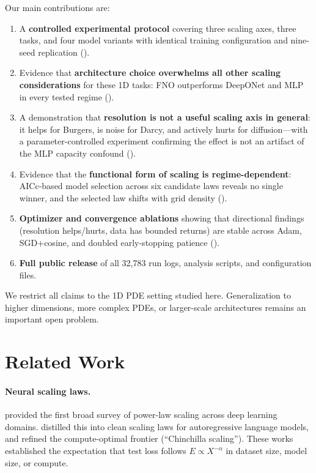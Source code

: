 \documentclass[11pt]{article}
\begin{document}
Our main contributions are:
\begin{enumerate}[leftmargin=*,itemsep=2pt]
  \item A \textbf{controlled experimental protocol} covering three
    scaling axes, three tasks, and four model variants with identical
    training configuration and nine-seed replication
    ().

  \item Evidence that \textbf{architecture choice overwhelms all other
    scaling considerations} for these 1D tasks: FNO outperforms
    DeepONet and MLP in every tested regime ().

  \item A demonstration that \textbf{resolution is not a useful scaling
    axis in general}: it helps for Burgers, is noise for Darcy, and
    actively hurts for diffusion---with a parameter-controlled
    experiment confirming the effect is not an artifact of the
    MLP capacity confound ().

  \item Evidence that the \textbf{functional form of scaling is
    regime-dependent}: AICc-based model selection across six candidate
    laws reveals no single winner, and the selected law shifts with
    grid density ().

  \item \textbf{Optimizer and convergence ablations} showing that
    directional findings (resolution helps/hurts, data has bounded
    returns) are stable across Adam, SGD+cosine, and doubled
    early-stopping patience ().

  \item \textbf{Full public release} of all 32{,}783 run logs,
    analysis scripts, and configuration files.
\end{enumerate}

We restrict all claims to the 1D PDE setting studied here.
Generalization to higher dimensions, more complex PDEs, or
larger-scale architectures remains an important open problem.


\section{Related Work}
\label{sec:related}

\paragraph{Neural scaling laws.}
\citet{hestness2017deep} provided the first broad survey of power-law
scaling across deep learning domains. \citet{kaplan2020scaling}
distilled this into clean scaling laws for autoregressive language
models, and \citet{hoffmann2022training} refined the compute-optimal
frontier (``Chinchilla scaling''). These works established the
expectation that test loss follows $E \propto X^{-\alpha}$ in
dataset size, model size, or compute.
\end{document}
